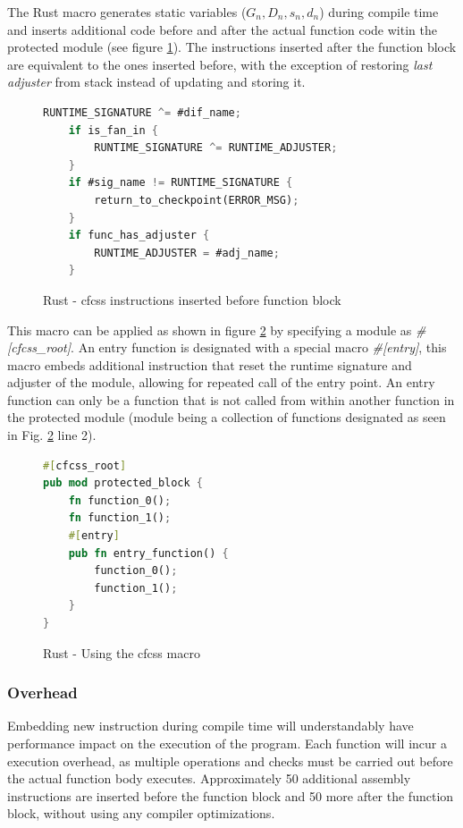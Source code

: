 The Rust macro generates static variables ({$G_n, D_n, s_n, d_n$}) during compile time and inserts additional code before and after the actual function code witin the protected module (see figure \ref{fig:rust_cfcss_macro}). The instructions inserted after the function block are equivalent to the ones inserted before, with the exception of restoring \textit{last adjuster} from stack instead of updating and storing it.

\begin{figure}[!h]
    \begin{lstlisting}[language=Rust]
    RUNTIME_SIGNATURE ^= #dif_name;
    if is_fan_in {
        RUNTIME_SIGNATURE ^= RUNTIME_ADJUSTER;
    }
    if #sig_name != RUNTIME_SIGNATURE {
        return_to_checkpoint(ERROR_MSG);
    }
    if func_has_adjuster {
        RUNTIME_ADJUSTER = #adj_name;
    }
    \end{lstlisting}
    \caption{Rust - \acrshort{cfcss} instructions inserted before function block}
    \label{fig:rust_cfcss_macro}
    \end{figure}

This macro can be applied as shown in figure \ref{fig:rust_cfcss_macro_example} by specifying a module as \textit{\#[cfcss\_root]}. An entry function is designated with a special macro \textit{\#[entry]}, this macro embeds additional instruction that reset the runtime signature and adjuster of the module, allowing for repeated call of the entry point. An entry function can only be a function that is not called from within another function in the protected module (module being a collection of functions designated as seen in Fig. \ref{fig:rust_cfcss_macro_example} line 2).

\begin{figure}[!h]
\begin{lstlisting}[language=Rust]
#[cfcss_root]
pub mod protected_block {
    fn function_0();
    fn function_1();
    #[entry]
    pub fn entry_function() {
        function_0();
        function_1();
    }
}
\end{lstlisting}
\caption{Rust - Using the \acrshort{cfcss} macro}
\label{fig:rust_cfcss_macro_example}
\end{figure}

\subsubsection{Overhead}

Embedding new instruction during compile time will understandably have performance impact on the execution of the program. Each function will incur a execution overhead, as multiple operations and checks must be carried out before the actual function body executes. Approximately 50 additional assembly instructions are inserted before the function block and 50 more after the function block, without using any compiler optimizations.

